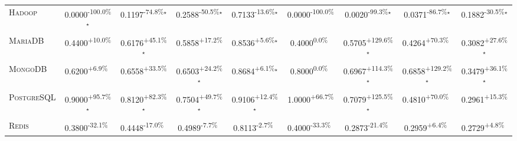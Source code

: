 \begin{table}[htbp]
\begin{tabular}{l|cccc|cccc}
\textsc{Hadoop} & \cellcolor{red!30}0.0000\textsuperscript{-100.0\%}$^\star$ & \cellcolor{red!30}0.1197\textsuperscript{-74.8\%}$^\star$ & \cellcolor{red!30}0.2588\textsuperscript{-50.5\%}$^\star$ & \cellcolor{red!30}0.7133\textsuperscript{-13.6\%}$^\star$ & \cellcolor{red!30}0.0000\textsuperscript{-100.0\%}$^{\,\,\,}$ & \cellcolor{red!30}0.0020\textsuperscript{-99.3\%}$^\star$ & \cellcolor{red!30}0.0371\textsuperscript{-86.7\%}$^\star$ & \cellcolor{red!30}0.1882\textsuperscript{-30.5\%}$^\star$ \\
\textsc{MariaDB} & \cellcolor{green!30}0.4400\textsuperscript{+10.0\%}$^{\,\,\,}$ & \cellcolor{green!30}0.6176\textsuperscript{+45.1\%}$^\star$ & \cellcolor{green!30}0.5858\textsuperscript{+17.2\%}$^{\,\,\,}$ & \cellcolor{green!30}0.8536\textsuperscript{+5.6\%}$^\star$ & \cellcolor{red!30}0.4000\textsuperscript{0.0\%}$^{\,\,\,}$ & \cellcolor{green!30}0.5705\textsuperscript{+129.6\%}$^\star$ & \cellcolor{green!30}0.4264\textsuperscript{+70.3\%}$^{\,\,\,}$ & \cellcolor{green!30}0.3082\textsuperscript{+27.6\%}$^\star$ \\
\textsc{MongoDB} & \cellcolor{green!30}0.6200\textsuperscript{+6.9\%}$^{\,\,\,}$ & \cellcolor{green!30}0.6558\textsuperscript{+33.5\%}$^{\,\,\,}$ & \cellcolor{green!30}0.6503\textsuperscript{+24.2\%}$^\star$ & \cellcolor{green!30}0.8684\textsuperscript{+6.1\%}$^\star$ & \cellcolor{red!30}0.8000\textsuperscript{0.0\%}$^{\,\,\,}$ & \cellcolor{green!30}0.6967\textsuperscript{+114.3\%}$^\star$ & \cellcolor{green!30}0.6858\textsuperscript{+129.2\%}$^\star$ & \cellcolor{green!30}0.3479\textsuperscript{+36.1\%}$^\star$ \\
\textsc{PostgreSQL} & \cellcolor{green!30}0.9000\textsuperscript{+95.7\%}$^\star$ & \cellcolor{green!30}0.8120\textsuperscript{+82.3\%}$^\star$ & \cellcolor{green!30}0.7504\textsuperscript{+49.7\%}$^\star$ & \cellcolor{green!30}0.9106\textsuperscript{+12.4\%}$^\star$ & \cellcolor{green!30}1.0000\textsuperscript{+66.7\%}$^{\,\,\,}$ & \cellcolor{green!30}0.7079\textsuperscript{+125.5\%}$^\star$ & \cellcolor{green!30}0.4810\textsuperscript{+70.0\%}$^{\,\,\,}$ & \cellcolor{green!30}0.2961\textsuperscript{+15.3\%}$^{\,\,\,}$ \\
\textsc{Redis} & \cellcolor{red!30}0.3800\textsuperscript{-32.1\%}$^{\,\,\,}$ & \cellcolor{red!30}0.4448\textsuperscript{-17.0\%}$^{\,\,\,}$ & \cellcolor{red!30}0.4989\textsuperscript{-7.7\%}$^{\,\,\,}$ & \cellcolor{red!30}0.8113\textsuperscript{-2.7\%}$^{\,\,\,}$ & \cellcolor{red!30}0.4000\textsuperscript{-33.3\%}$^{\,\,\,}$ & \cellcolor{red!30}0.2873\textsuperscript{-21.4\%}$^{\,\,\,}$ & \cellcolor{green!30}0.2959\textsuperscript{+6.4\%}$^{\,\,\,}$ & \cellcolor{green!30}0.2729\textsuperscript{+4.8\%}$^{\,\,\,}$ \\

\end{tabular}
\end{table}
